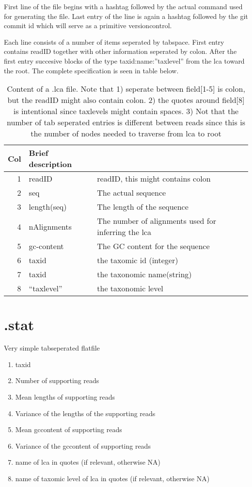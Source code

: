 \documentclass[10pt]{article}
\begin{document}
First line of the file begins with a hashtag followed by the actual command used for generating the file. Last entry of the line is again a hashtag followed by the git commit id which will serve as a primitive versioncontrol.

Each line consists of a number of items seperated by tabspace. First entry contains readID together with other information seperated by colon. After the first entry succesive blocks of the type taxid:name:''taxlevel'' from the lca toward the root. The complete specification is seen in table below.

\begin{table}[h]
\begin{tabular}{rll}
  \hline
  {\bf Col} & {\bf Brief description} \\
  \hline
  1 & {\sf readID} & readID, this might contains colon\\
  2 & {\sf seq} & The actual sequence\\
  3 & {\sf length(seq)} & The length of the sequence\\
  4 & {\sf nAlignments} & The number of alignments used for inferring the lca\\
  5 & {\sf gc-content} & The GC content for the sequence\\\hline\hline
  6 & {\sf taxid} & the taxomic id (integer)\\
  7 & {\sf taxid} & the taxonomic name(string)\\
  8 & {\sf ``taxlevel''} & the taxonomic level\\\hline\hline      
\end{tabular}\label{tab2}
\caption{Content of a .lca file. Note that 1) seperate between field[1-5] is colon, but the readID might also contain colon. 2) the quotes around field[8] is intentional since taxlevels might contain spaces. 3) Not that the number of tab seperated entries is different between reads since this is the number of nodes needed to traverse from lca to root}
\end{table}
\section{.stat}\label{sec:stat}
Very simple tabseperated flatfile
\begin{enumerate}
\item taxid
\item Number of supporting reads
\item Mean lengths of supporting reads
\item Variance of the lengths of the supporting reads
\item Mean gccontent of supporting reads
\item Variance of the gccontent of supporting reads
\item name of lca in quotes (if relevant, otherwise NA)
\item name of taxomic level of lca in quotes (if relevant, otherwise NA)
\end{enumerate}
\clearpage
\end{document}
